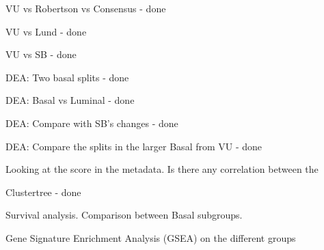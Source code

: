 \begin{todolist}
    \item VU vs Robertson vs Consensus - done
    \item VU vs Lund - done
    \item VU vs SB - done
    \item DEA: Two basal splits - done
    \item DEA: Basal vs Luminal - done
    \item DEA: Compare with SB's changes - done
    \item DEA: Compare the splits in the larger Basal from VU - done
    \item Looking at the score in the metadata. Is there any correlation between the 
    \item Clustertree - done
    \item Survival analysis. Comparison between Basal subgroups.
    \item Gene Signature Enrichment Analysis (GSEA) on the different groups 
\end{todolist}
